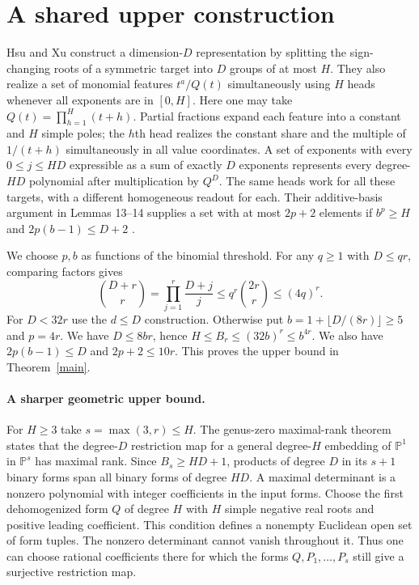 \documentclass[11pt]{article}
\begin{document}
\section{A shared upper construction}
Hsu and Xu construct a dimension-$D$ representation by splitting the sign-changing roots of a symmetric target into $D$ groups of at most $H$. They also realize a set of monomial features $t^a/Q(t)$ simultaneously using $H$ heads whenever all exponents are in $[0,H]$. Here one may take $Q(t)=\prod_{h=1}^H(t+h)$. Partial fractions expand each feature into a constant and $H$ simple poles; the $h$th head realizes the constant share and the multiple of $1/(t+h)$ simultaneously in all value coordinates. A set of exponents with every $0\le j\le HD$ expressible as a sum of exactly $D$ exponents represents every degree-$HD$ polynomial after multiplication by $Q^D$. The same heads work for all these targets, with a different homogeneous readout for each. Their additive-basis argument in Lemmas 13--14 supplies a set with at most $2p+2$ elements if $b^p\ge H$ and $2p(b-1)\le D+2$ \cite{hsuxu}.

We choose $p,b$ as functions of the binomial threshold. For any $q\ge1$ with $D\le qr$, comparing factors gives
\[
 \binom{D+r}{r}=\prod_{j=1}^r\frac{D+j}{j}
 \le q^r\binom{2r}{r}\le(4q)^r.
\]
For $D<32r$ use the $d\le D$ construction. Otherwise put $b=1+\lfloor D/(8r)\rfloor\ge5$ and $p=4r$. We have $D\le8br$, hence $H\le B_r\le(32b)^r\le b^{4r}$. We also have $2p(b-1)\le D$ and $2p+2\le10r$. This proves the upper bound in Theorem~\ref{main}.

\paragraph{A sharper geometric upper bound.}
For $H\ge3$ take $s=\max(3,r)\le H$. The genus-zero maximal-rank theorem \cite{ballico,larson} states that the degree-$D$ restriction map for a general degree-$H$ embedding of $\mathbb P^1$ in $\mathbb P^s$ has maximal rank. Since $B_s\ge HD+1$, products of degree $D$ in its $s+1$ binary forms span all binary forms of degree $HD$. A maximal determinant is a nonzero polynomial with integer coefficients in the input forms. Choose the first dehomogenized form $Q$ of degree $H$ with $H$ simple negative real roots and positive leading coefficient. This condition defines a nonempty Euclidean open set of form tuples. The nonzero determinant cannot vanish throughout it. Thus one can choose rational coefficients there for which the forms $Q,P_1,\ldots,P_s$ still give a surjective restriction map.
\end{document}
